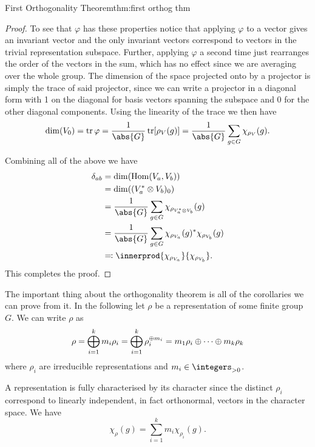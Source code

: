 \begin{thm}{First Orthogonality Theorem}{thm:first orthog thm}
\begin{proof}
        To see that \(\varphi\) has these properties notice that applying
        \(\varphi\) to a vector gives an invariant vector and the only invariant vectors
        correspond to vectors in the trivial representation subspace.
        Further, applying \(\varphi\) a second time just rearranges the
        order of the vectors in the sum, which has no effect since we are averaging over
        the whole group.
        The dimension of the space projected onto by a projector is simply
        the trace of said projector, since we can write a projector in a diagonal form
        with 1 on the diagonal for basis vectors spanning the subspace and 0 for the
        other diagonal components.
        Using the linearity of the trace we then have
        \begin{equation}
            \dim(V_0) = \tr \varphi = \frac{1}{\abs{G}} \tr[\rho_V(g)] =
            \frac{1}{\abs{G}} \sum_{g \in G} \chi_{\rho_V}(g).
        \end{equation}
        
        Combining all of the above we have
        \begin{align}
            \delta_{ab} &= \dim(\Hom(V_a, V_b))\\
            &= \dim((V_a^* \directproduct V_b)_0)\\
            &= \frac{1}{\abs{G}} \sum_{g\in G} \chi_{\rho_{V_a^*
                    \directproduct V_b}}(g)\\
            &= \frac{1}{\abs{G}} \sum_{g\in G}
            \chi_{\rho_{V_a}}(g)^*\chi_{\rho_{V_b}}(g)\\
            &\eqqcolon \innerprod{\chi_{\rho_{V_a}}}{\chi_{\rho_{V_b}}}.
        \end{align}
        This completes the proof.
    \end{proof}
\end{thm}

The important thing about the orthogonality theorem is all of the
corollaries we can prove from it.
In the following let \(\rho\) be a representation of some finite group
\(G\).
We can write \(\rho\) as
\begin{equation}
    \rho = \bigoplus_{i = 1}^{k} m_i \rho_i = \bigoplus_{i = 1}^{k}
    \rho_i^{\oplus m_i} = m_1 \rho_i \oplus \dotsb \oplus m_k\rho_k
\end{equation}
where \(\rho_i\) are irreducible representations and \(m_i \in
\positiveintegers\).

\begin{crl}{}{}
    A representation is fully characterised by its character since the
    distinct \(\rho_i\) correspond to linearly independent, in fact orthonormal,
    vectors in the character space.
    We have
    \begin{equation}
        \chi_\rho(g) = \sum_{i = 1}^{k} m_i \chi_{\rho_i}(g).
    \end{equation}
\end{crl}

